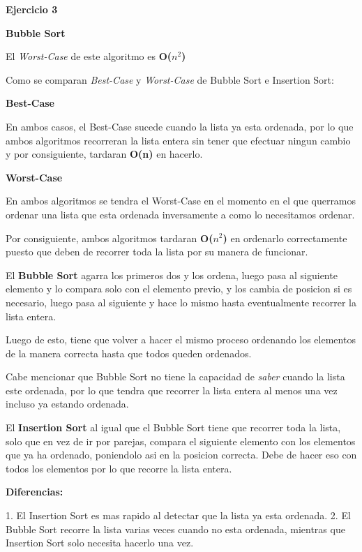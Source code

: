 \documentclass[11pt]{article}
\begin{document}
\begin{flushleft}
\textbf{Ejercicio 3}
\end{flushleft}

\textbf{Bubble Sort}

El \textit{Worst-Case} de este algoritmo es \textbf{O($n^2$)}

\begin{flushleft}
Como se comparan \textit{Best-Case} y \textit{Worst-Case} de Bubble Sort e Insertion Sort:
\end{flushleft} 

\begin{flushleft}
\textbf{Best-Case}
\end{flushleft}

En ambos casos, el Best-Case sucede cuando la lista ya esta ordenada, por lo que ambos algoritmos recorreran la lista entera sin tener que efectuar ningun cambio y por consiguiente, tardaran \textbf{O(n)} en hacerlo.

\begin{flushleft}
\textbf{Worst-Case}
\end{flushleft}

En ambos algoritmos se tendra el Worst-Case en el momento en el que querramos ordenar una lista que esta ordenada inversamente a como lo necesitamos ordenar. 

Por consiguiente, ambos algoritmos tardaran \textbf{O($n^2$)} en ordenarlo correctamente puesto que deben de recorrer toda la lista por su manera de funcionar.
\begin{flushleft}
El \textbf{Bubble Sort} agarra los primeros dos y  los ordena, luego pasa al siguiente elemento y lo compara solo con el elemento previo, y los cambia de posicion si es necesario, luego pasa al siguiente y hace lo mismo hasta eventualmente recorrer la lista entera.

Luego de esto, tiene que volver a hacer el mismo proceso ordenando los elementos de la manera correcta hasta que todos queden ordenados.

Cabe mencionar que Bubble Sort no tiene la capacidad de \textit{saber} cuando la lista este ordenada, por lo que tendra que recorrer la lista entera al menos una vez incluso ya estando ordenada.
\end{flushleft}

\begin{flushleft}
El \textbf{Insertion Sort} al igual que el Bubble Sort tiene que recorrer toda la lista, solo que en vez de ir por parejas, compara el siguiente elemento con los elementos que ya ha ordenado, poniendolo asi en la posicion correcta.
Debe de hacer eso con todos los elementos por lo que recorre la lista entera.
\end{flushleft}

\begin{flushleft}
\textbf{Diferencias: }
\end{flushleft}
1. El Insertion Sort es mas rapido al detectar que la lista ya esta ordenada.
2. El Bubble Sort recorre la lista varias veces cuando no esta ordenada, mientras que Insertion Sort solo necesita hacerlo una vez.
\end{document}
